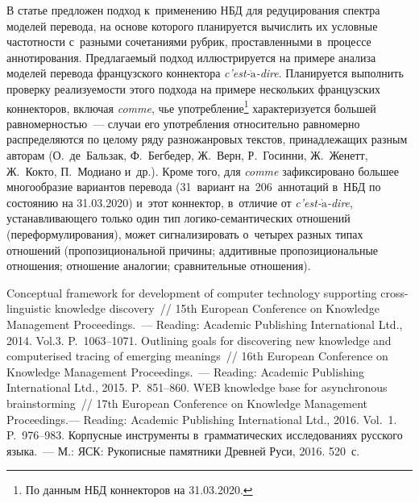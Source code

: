 \begin{multicols}{2}
  В статье предложен подход к~применению НБД для редуцирования спектра 
моделей перевода, на основе которого планируется вычислить их условные 
частотности с~разными сочетаниями рубрик, проставленными в~процессе 
аннотирования. Предлагаемый подход иллюстрируется на примере анализа 
моделей перевода французского коннектора \textit{c'est-$\grave{\mbox{a}}$-dire}. 
Планируется выполнить проверку реализуемости этого подхода на примере 
нескольких французских коннекторов, включая \textit{comme}, чье 
употребление\footnote{По данным НБД коннекторов на 31.03.2020.} характеризуется 
большей равномерностью~--- случаи его употребления 
относительно равномерно распределяются по целому ряду разножанровых 
текстов, принадлежащих разным авторам (О.~де~Бальзак, Ф.~Бегбедер, Ж.~Верн, 
Р.~Госинни, Ж.~Женетт, Ж.~Кокто, П.~Модиано и~др.). Кроме того, для \textit{comme} 
зафиксировано большее многообразие вариантов перевода 
(31~вариант на~206~аннотаций в~НБД по состоянию на 31.03.2020) и~этот 
коннектор, в~отличие от \textit{c'est-$\grave{\mbox{a}}$-dire}, уста\-нав\-ли\-ва\-ющего 
только один тип ло\-ги\-ко-се\-ман\-ти\-че\-ских отношений (переформулирования),
 может 
сигнализировать о~четырех разных типах отношений (пропозициональной 
причины; аддитивные пропозициональные отношения; отношение аналогии; 
сравнительные отношения).

  
{\small\frenchspacing
 {%
 \begin{thebibliography}{99}
  
 Conceptual framework 
for development of computer technology supporting cross-linguistic knowledge discovery~// 15th 
European Conference on Knowledge Management Proceedings.~--- Reading: Academic Publishing 
International Ltd., 2014. Vol.3. P.~1063--1071.
 Outlining goals for discovering new knowledge and computerised 
tracing of emerging meanings~// 16th European Conference on Knowledge Management 
Proceedings.~--- Reading: Academic Publishing International Ltd., 2015. P.~851--860.
 WEB knowledge base for 
asynchronous brainstorming~// 17th European Conference on Knowledge Management 
Proceedings.--- Reading: Academic Publishing International Ltd., 2016. Vol.~1. P.~976--983.
 Корпусные инструменты в~грамматических исследованиях русского 
языка.~--- М.: ЯСК: Рукописные памятники Древней Руси, 2016. 520~с.


\end{thebibliography}}}
\end{multicols}
